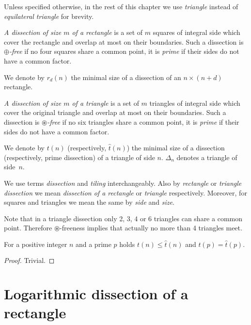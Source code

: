 Unless specified otherwise, in the rest of this chapter we use \emph{triangle} instead of \emph{equilateral triangle} for brevity.

\begin{defn}
\emph{A dissection of size $m$ of a rectangle} is a set of $m$ squares of integral side which cover the rectangle and overlap at most on their boundaries. Such a dissection is \emph{$\oplus$-free} if no four squares share a common point, it is \emph{prime} if their sides do not have a common factor.

We denote by $r_d(n)$ the minimal size of a dissection of an $n \times (n+d)$ rectangle.
\end{defn}

\begin{defn}
\label{defn:triangle-dissection}
\emph{A dissection of size $m$ of a triangle} is a set of $m$ triangles of integral side which cover the original triangle and overlap at most on their boundaries. Such a dissection is \emph{$\circledast$-free} if no six triangles share a common point, it is \emph{prime} if their sides do not have a common factor.

We denote by $t(n)$ (respectively, $\hat t(n)$) the minimal size of a dissection (respectively, prime dissection) of a triangle of side $n$. $\Delta_n$ denotes a triangle of side~$n$.
\end{defn}

We use terms \emph{dissection} and \emph{tiling} interchangeably. Also by \emph{rectangle} or \emph{triangle dissection} we mean \emph{dissection of a rectangle} or \emph{triangle} respectively. Moreover, for squares and triangles we mean the same by \emph{side} and \emph{size}.

Note that in a triangle dissection only 2, 3, 4 or 6 triangles can share a common point. Therefore $\circledast$-freeness implies that actually no more than 4 triangles meet.

\begin{lem}
For a positive integer $n$ and a prime $p$ holds $t(n) \leq \hat t(n)$ and $t(p) = \hat t(p)$.
\end{lem}
\begin{proof}
Trivial.
\end{proof}

\section{Logarithmic dissection of a rectangle}
\label{sec:log-rectangle}

